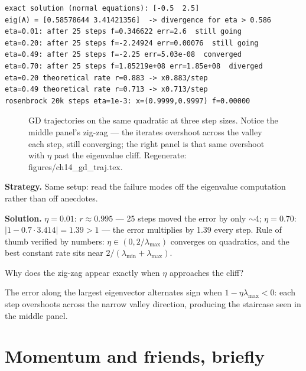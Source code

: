 \begin{lstlisting}[caption={Output of the GD experiment. Notice the
threshold is exact: $\eta=0.70>0.586$ diverges by a factor of $10^{8}$;
Rosenbrock converges only because $\eta$ was kept tiny.}]
exact solution (normal equations): [-0.5  2.5]
eig(A) = [0.58578644 3.41421356]  -> divergence for eta > 0.586
eta=0.01: after 25 steps f=0.346622 err=2.6  still going
eta=0.20: after 25 steps f=-2.24924 err=0.00076  still going
eta=0.49: after 25 steps f=-2.25 err=5.03e-08  converged
eta=0.70: after 25 steps f=1.85219e+08 err=1.85e+08  diverged
eta=0.20 theoretical rate r=0.883 -> x0.883/step
eta=0.49 theoretical rate r=0.713 -> x0.713/step
rosenbrock 20k steps eta=1e-3: x=(0.9999,0.9997) f=0.00000
\end{lstlisting}

\begin{figure}[htbp]
\centering

\caption{GD trajectories on the same quadratic at three step sizes.
Notice the middle panel's zig-zag --- the iterates overshoot across the
valley each step, still converging; the right panel is that same
overshoot with $\eta$ past the eigenvalue cliff. Regenerate:
\ttfamily figures/ch14\_gd\_traj.tex.}
\label{fig:gdtraj}
\end{figure}

\begin{example}\label{ex:gdstep}
\textbf{Strategy.} Same setup: read the failure modes off the eigenvalue
computation rather than off anecdotes.

\textbf{Solution.} $\eta=0.01$: $r\approx0.995$ --- 25 steps moved the
error by only $\sim$4; $\eta=0.70$: $|1-0.7\cdot3.414|=1.39>1$ ---
the error multiplies by 1.39 every step. Rule of thumb verified by
numbers: $\eta\in(0,2/\lambda_{\max})$ converges on quadratics, and the
best constant rate sits near $2/(\lambda_{\min}+\lambda_{\max})$.
\end{example}

\begin{exercise}[medium]
Why does the zig-zag appear exactly when $\eta$ approaches the cliff?
\begin{solution}
The error along the largest eigenvector alternates sign when
$1-\eta\lambda_{\max}<0$: each step overshoots across the narrow
valley direction, producing the staircase seen in the middle panel.
\end{solution}
\end{exercise}

\section{Momentum and friends, briefly}\label{sec:opt-momentum}


